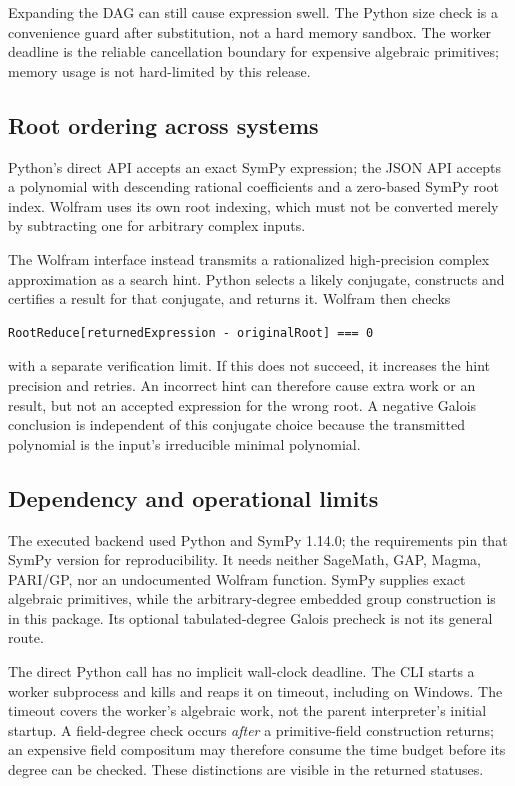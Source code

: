 \documentclass[11pt,letterpaper]{article}
\theoremstyle{definition}\newtheorem{definition}[theorem]{Definition}
\theoremstyle{remark}\newtheorem{remark}[theorem]{Remark}
\begin{document}
Expanding the DAG can still cause expression swell. The Python
 size check is a convenience guard after
substitution, not a hard memory sandbox. The worker deadline is the reliable
cancellation boundary for expensive algebraic primitives; memory usage is not
hard-limited by this release.

\subsection{Root ordering across systems}
Python's direct API accepts an exact SymPy expression; the JSON API accepts a
polynomial with descending rational coefficients and a zero-based SymPy root
index. Wolfram uses its own root indexing, which must not be converted merely
by subtracting one for arbitrary complex inputs.

The Wolfram interface instead transmits a rationalized high-precision complex
approximation as a search hint. Python selects a likely conjugate, constructs
and certifies a result for that conjugate, and returns it. Wolfram then checks
\begin{lstlisting}
RootReduce[returnedExpression - originalRoot] === 0
\end{lstlisting}
with a separate verification limit. If this does not succeed, it increases the
hint precision and retries. An incorrect hint can therefore cause extra work
or an  result, but not an accepted expression for the wrong root.
A negative Galois conclusion is independent of this conjugate choice because
the transmitted polynomial is the input's irreducible minimal polynomial.

\subsection{Dependency and operational limits}
The executed backend used Python and SymPy 1.14.0; the requirements pin that
SymPy version for reproducibility. It needs neither SageMath, GAP, Magma,
PARI/GP, nor an undocumented Wolfram function. SymPy supplies exact algebraic
primitives, while the arbitrary-degree embedded group construction is in this
package. Its optional tabulated-degree Galois precheck is not its general route.

The direct Python call has no implicit wall-clock deadline. The CLI starts a
worker subprocess and kills and reaps it on timeout, including on Windows.
The timeout covers the worker's algebraic work, not the parent interpreter's
initial startup. A field-degree check occurs \emph{after} a primitive-field
construction returns; an expensive field compositum may therefore consume the
time budget before its degree can be checked. These distinctions are visible
in the returned statuses.
\end{document}
